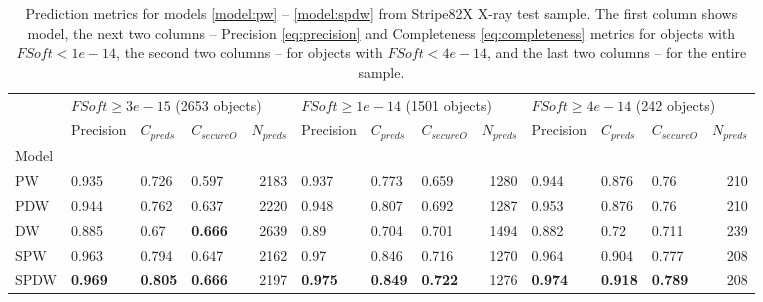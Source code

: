 \documentclass[fleqn,usenatbib]{mnras}
\begin{document}
\begin{table}
	\begin{tabular}{llllrlllrlllr}
            \hline
            {} & \multicolumn{4}{l}{$FSoft \geq 3e-15$ (2653 objects)} & \multicolumn{4}{l}{$FSoft \geq 1e-14$ (1501 objects)} & \multicolumn{4}{l}{$FSoft \geq 4e-14$ (242 objects)} \\
            {} &                         Precision &     $C_{preds}$ &   $C_{secureO}$ & $N_{preds}$ &                         Precision &     $C_{preds}$ &   $C_{secureO}$ & $N_{preds}$ &                        Precision &     $C_{preds}$ &   $C_{secureO}$ & $N_{preds}$ \\
            Model &                                   &                 &                 &             &                                   &                 &                 &             &                                  &                 &                 &             \\
            \hline
            PW    &                             0.935 &           0.726 &           0.597 &        2183 &                             0.937 &           0.773 &           0.659 &        1280 &                            0.944 &           0.876 &            0.76 &         210 \\
            PDW   &                             0.944 &           0.762 &           0.637 &        2220 &                             0.948 &           0.807 &           0.692 &        1287 &                            0.953 &           0.876 &            0.76 &         210 \\
            DW    &                             0.885 &            0.67 &  \textbf{0.666} &        2639 &                              0.89 &           0.704 &           0.701 &        1494 &                            0.882 &            0.72 &           0.711 &         239 \\
            SPW   &                             0.963 &           0.794 &           0.647 &        2162 &                              0.97 &           0.846 &           0.716 &        1270 &                            0.964 &           0.904 &           0.777 &         208 \\
            SPDW  &                    \textbf{0.969} &  \textbf{0.805} &  \textbf{0.666} &        2197 &                    \textbf{0.975} &  \textbf{0.849} &  \textbf{0.722} &        1276 &                   \textbf{0.974} &  \textbf{0.918} &  \textbf{0.789} &         208 \\
            \hline
            \end{tabular}
            \caption{Prediction metrics for models \ref{model:pw} -- \ref{model:spdw} from Stripe82X X-ray test sample. The first column shows model, the next two columns -- Precision \ref{eq:precision} and Completeness \ref{eq:completeness} metrics for objects with $FSoft < 1e-14$, the second two columns -- for objects with $FSoft < 4e-14$, and the last two columns -- for the entire sample.}
\end{table}
\end{document}
